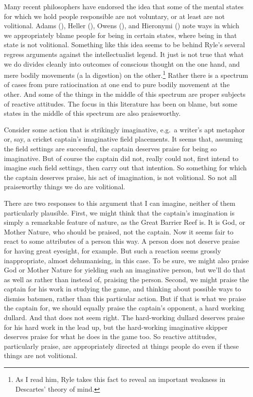 \documentclass[
  10pt,
  letterpaper,
  DIV=11,
  numbers=noendperiod,
  twoside]{scrartcl}
\begin{document}
Many recent philosophers have endorsed the idea that some of the mental
states for which we hold people responsible are not voluntary, or at
least are not volitional. Adams (), Heller
(), Owens
(), and Hieronymi
() note ways in which we appropriately
blame people for being in certain states, where being in that state is
not volitional. Something like this idea seems to be behind Ryle's
several regress arguments against the intellectualist legend. It just is
not true that what we do divides cleanly into outcomes of conscious
thought on the one hand, and mere bodily movements (a la digestion) on
the other.\footnote{As I read him, Ryle takes this fact to reveal an
  important weakness in Descartes' theory of mind.} Rather there is a
spectrum of cases from pure ratiocination at one end to pure bodily
movement at the other. And some of the things in the middle of this
spectrum are proper subjects of reactive attitudes. The focus in this
literature has been on blame, but some states in the middle of this
spectrum are also praiseworthy.

Consider some action that is strikingly imaginative, e.g.~a writer's apt
metaphor or, say, a cricket captain's imaginative field placements. It
seems that, assuming the field settings are successful, the captain
deserves praise for being so imaginative. But of course the captain did
not, really could not, first intend to imagine such field settings, then
carry out that intention. So something for which the captain deserves
praise, his act of imagination, is not volitional. So not all
praiseworthy things we do are volitional.

There are two responses to this argument that I can imagine, neither of
them particularly plausible. First, we might think that the captain's
imagination is simply a remarkable feature of nature, as the Great
Barrier Reef is. It is God, or Mother Nature, who should be praised, not
the captain. Now it seems fair to react to some attributes of a person
this way. A person does not deserve praise for having great eyesight,
for example. But such a reaction seems grossly inappropriate, almost
dehumanising, in this case. To be sure, we might also praise God or
Mother Nature for yielding such an imaginative person, but we'll do that
as well as rather than instead of, praising the person. Second, we might
praise the captain for his work in studying the game, and thinking about
possible ways to dismiss batsmen, rather than this particular action.
But if that is what we praise the captain for, we should equally praise
the captain's opponent, a hard working dullard. And that does not seem
right. The hard-working dullard deserves praise for his hard work in the
lead up, but the hard-working imaginative skipper deserves praise for
what he does in the game too. So reactive attitudes, particularly
praise, are appropriately directed at things people do even if these
things are not volitional.
\end{document}
